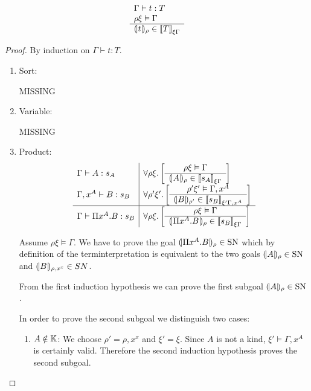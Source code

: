 \begin{theorem}
    $$
    \begin{array}{l} 
        \Gamma \vdash t : T
        \\
        \rho\xi \vDash \Gamma
     \\ \hline 
        {(\!|t|\!)_{\rho}} \in {{[\![}T{]\!]}}_{\xi\Gamma}
    \end{array}
    $$
    \def\goal#1#2#3#4#5{
        \forall #1 #2.
        \left[
        \ruleh{
            #1#2 \vDash #3
        }
        {
            \terminter{#4}{#1} \in \typeinter{#5}{#2#3}
        }
        \right]
    }

    \begin{proof}
        By induction on $\Gamma \vdash t : T$.

        \begin{enumerate}
        \item Sort:

            MISSING
        \item Variable:

            MISSING
        \item Product:
            $$
            \begin{array}{l|l}
                \Gamma \vdash A : s_A
                &\goal \rho \xi \Gamma A {s_A}
                \\
                \Gamma, x^A \vdash B: s_B
                & \goal {\rho'} {\xi'} {\Gamma,x^A} B {s_B}
                \\
                \hline
                \Gamma \vdash \Pi x^A. B : s_B
                &
                \goal \rho \xi \Gamma {\Pi x^A.B} {s_B}
            \end{array}
            $$

            Assume $\rho\xi \vDash \Gamma$. We have to prove the goal
                ${(\!|\Pi x^A.B|\!)_{\rho}} \in \text{SN}$ which by definition of the
                terminterpretation is equivalent to the two goals
                ${(\!|A|\!)_{\rho}} \in \text{SN}$
                and ${(\!|B|\!)_{\rho,x^x}} \in SN$.

            From the first induction hypothesis we can prove
            the first subgoal ${(\!|A|\!)_{\rho}} \in \text{SN}$.

            In order to prove the second subgoal we distinguish two cases:
            \begin{enumerate}
            \item $A \notin \mathbb{K}$:
                We choose $\rho' = \rho,x^x$ and $\xi' = \xi$.
                Since $A$ is not a kind, $\xi' \vDash \Gamma,x^A$ is
                certainly valid. Therefore the second induction hypothesis
                    proves the second subgoal.


\end{enumerate}
\end{enumerate}
\end{proof}
\end{theorem}
